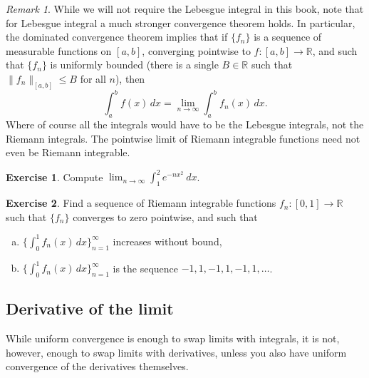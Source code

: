 \documentclass[12pt,openany]{book}
\newcommand{\snorm}[1]{\lVert {#1} \rVert}
\newcommand{\R}{{\mathbb{R}}}
\theoremstyle{plain}
\theoremstyle{remark}
\newtheorem{remark}[thm]{Remark}
\theoremstyle{definition}
\newenvironment{exbox}{%
    \def\FrameCommand{\vrule width 1pt \relax\hspace{10pt}}%
    \MakeFramed{\advance\hsize-\width\FrameRestore}%
}{%
    \endMakeFramed
}
\newenvironment{exparts}{%
    \leavevmode\begin{enumerate}[a),noitemsep,topsep=0pt,parsep=0pt,partopsep=0pt]
}{%
    \end{enumerate}
}
\theoremstyle{exercise}
\newtheorem{exercise}{Exercise}[section]
\theoremstyle{example}
\begin{document}
\begin{remark}
While we will not require the Lebesgue integral in this book, note that
for Lebesgue integral a much stronger convergence theorem holds.  In
particular, the dominated convergence theorem implies that if
$\{ f_n \}$ is a sequence of measurable functions on $[a,b]$,
converging pointwise to $f \colon [a,b] \to \R$, and such that
$\{ f_n \}$ is uniformly bounded (there is a single $B \in \R$ such that
$\snorm{f_n}_{[a,b]} \leq B$ for all $n$), then
\begin{equation*}
\int_a^b f(x) \, dx = \lim_{n\to\infty} \int_a^b f_n(x) \, dx .
\end{equation*}
Where of course all the integrals would have to be the Lebesgue integrals,
not the Riemann integrals.  The pointwise limit of Riemann integrable
functions need not even be Riemann integrable.
\end{remark}

\begin{exbox}
\begin{exercise}
Compute
$\displaystyle \lim_{n\to\infty} \int_1^2 e^{-nx^2} ~dx$.
\end{exercise}

\begin{exercise}
Find a sequence of Riemann integrable functions $f_n \colon [0,1] \to \R$ such
that $\{ f_n \}$ converges to zero pointwise, and such that
\begin{exparts}
\item
$\bigl\{ \int_0^1 f_n(x)\,dx \bigr\}_{n=1}^\infty$ increases without bound,
\item
$\bigl\{ \int_0^1 f_n(x)\,dx \bigr\}_{n=1}^\infty$ is the sequence $-1,1,-1,1,-1,1, \ldots$.
\end{exparts}
\end{exercise}
\end{exbox}

\subsection{Derivative of the limit}

While uniform convergence is enough to swap limits with integrals, it is not,
however, enough to swap limits with derivatives, unless you also have
uniform convergence of the derivatives themselves.
\end{document}
